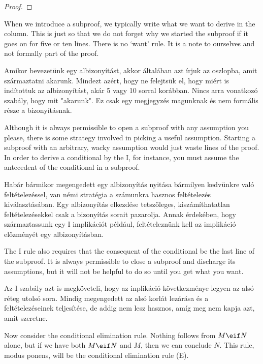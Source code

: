 \begin{proof}
	\open
		 
	\close
\end{proof}

When we introduce a subproof, we typically write what we want to derive in the column. This is just so that we do not forget why we started the subproof if it goes on for five or ten lines. There is no `want' rule. It is a note to ourselves and not formally part of the proof.

Amikor bevezetünk egy albizonyítást, akkor általában azt írjuk az oszlopba, amit származtatni akarunk. Mindezt azért, hogy ne felejtsük el, hogy miért is indítottuk az albizonyítást, akár 5 vagy 10 sorral korábban. Nincs arra vonatkozó szabály, hogy mit "akarunk". Ez csak egy megjegyzés magunknak és nem formális része a bizonyításnak.

Although it is always permissible to open a subproof with any assumption you please, there is some strategy involved in picking a useful assumption. Starting a subproof with an arbitrary, wacky assumption would just waste lines of the proof. In order to derive a conditional by the {\eif}I, for instance, you must assume the antecedent of the conditional in a subproof.

Habár bármikor megengedett egy albizonyítás nyitása bármilyen kedvünkre való feltételezéssel, van némi stratégia a számunkra hasznos feltételezés kiválasztásában. Egy albizonyítás elkezdése tetszőleges, kiszámíthatatlan feltételezésekkel csak a bizonyítás sorait pazarolja. Annak érdekében, hogy származtassunk egy {\eif}I implikációt például, feltételeznünk kell az implikáció előzményét egy albizonyításban.



The {\eif}I rule also requires that the consequent of the conditional be the last line of the subproof. It is always permissible to close a subproof and discharge its assumptions, but it will not be helpful to do so until you get what you want.

Az {\eif}I szabály azt is megköveteli, hogy az inplikáció következménye legyen az alsó réteg utolsó sora. Mindig megengedett az alsó korlát lezárása és a feltételezéseinek teljesítése, de addig nem lesz hasznos, amíg meg nem kapja azt, amit szeretne.

Now consider the conditional elimination rule. Nothing follows from $M\eif N$ alone, but if we have both $M \eif N$ and $M$, then we can conclude $N$. This rule, modus ponens, will be the conditional elimination rule ({\eif}E).

